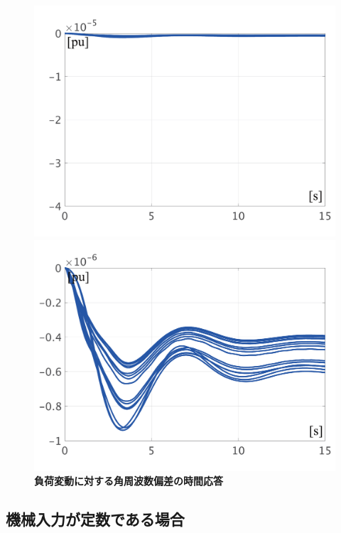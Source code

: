 \documentclass[tombow,dvipdfmx]{corona-a5-1.1}
\begin{document}
\begin{figure}[t]
{\begin{minipage}{0.49\linewidth}
    \includegraphics[width = 1.0\linewidth]{figs/WavrWagc}
    \medskip
  \end{minipage}
  \begin{minipage}{0.49\linewidth}
    \centering
    \includegraphics[width = 1.0\linewidth]{figs/WavrWagcL}
    \medskip
  \end{minipage}
  }
  \medskip
  \caption{\textbf{負荷変動に対する角周波数偏差の時間応答} }
  \label{fig:omegasAGC}
\medskip
\end{figure}

\subsection{機械入力が定数である場合}\label{sec:onlyAVR}
\end{document}
